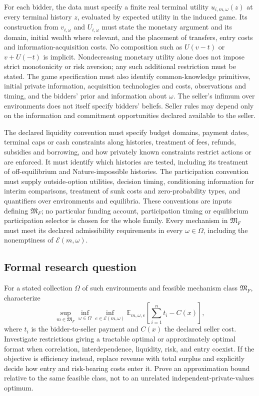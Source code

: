 \documentclass[11pt,a4paper]{article}
\begin{document}
For each bidder, the data must specify a finite real terminal utility $u_{i,m,\omega}(z)$ at every terminal history $z$, evaluated by expected utility in the induced game. Its construction from $v_{i,\omega}$ and $U_{i,\omega}$ must state the monetary argument and its domain, initial wealth where relevant, and the placement of transfers, entry costs and information-acquisition costs. No composition such as $U(v-t)$ or $v+U(-t)$ is implicit. Nondecreasing monetary utility alone does not impose strict monotonicity or risk aversion; any such additional restriction must be stated. The game specification must also identify common-knowledge primitives, initial private information, acquisition technologies and costs, observations and timing, and the bidders' prior and information about $\omega$. The seller's infimum over environments does not itself specify bidders' beliefs. Seller rules may depend only on the information and commitment opportunities declared available to the seller.

The declared liquidity convention must specify budget domains, payment dates, terminal caps or cash constraints along histories, treatment of fees, refunds, subsidies and borrowing, and how privately known constraints restrict actions or are enforced. It must identify which histories are tested, including its treatment of off-equilibrium and Nature-impossible histories. The participation convention must supply outside-option utilities, decision timing, conditioning information for interim comparisons, treatment of sunk costs and zero-probability types, and quantifiers over environments and equilibria. These conventions are inputs defining $\mathfrak M_F$; no particular funding account, participation timing or equilibrium participation selector is chosen for the whole family. Every mechanism in $\mathfrak M_F$ must meet its declared admissibility requirements in every $\omega\in\Omega$, including the nonemptiness of $\mathcal E(m,\omega)$.

\subsection*{Formal research question}

For a stated collection $\Omega$ of such environments and feasible mechanism class $\mathfrak M_F$, characterize
\[
\sup_{m\in\mathfrak M_F}\inf_{\omega\in\Omega}\inf_{e\in\mathcal E(m,\omega)}
 \mathbb E_{m,\omega,e}\!\left[\sum_{i=1}^n t_i-C(x)\right],
\]
where $t_i$ is the bidder-to-seller payment and $C(x)$ the declared seller cost. Investigate restrictions giving a tractable optimal or approximately optimal format when correlation, interdependence, liquidity, risk, and entry coexist. If the objective is efficiency instead, replace revenue with total surplus and explicitly decide how entry and risk-bearing costs enter it. Prove an approximation bound relative to the same feasible class, not to an unrelated independent-private-values optimum.
\end{document}
